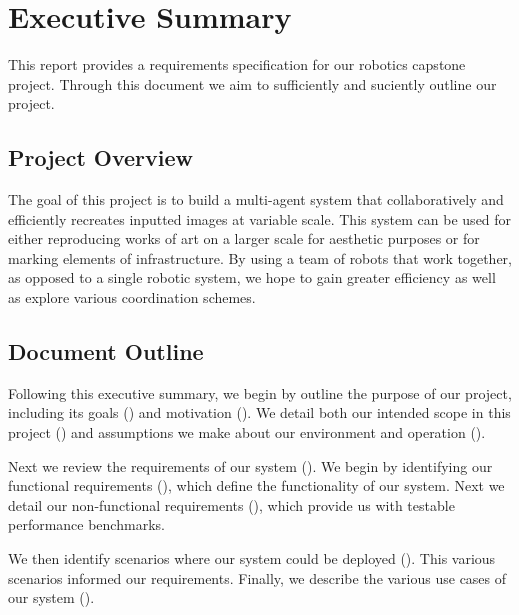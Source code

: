 
\section {Executive Summary}
\label{sec:executive_summary}
This report provides a requirements specification for our robotics capstone project. Through this document we aim to sufficiently and suciently outline our project. 

\subsection{Project Overview}
The goal of this project is to build a multi-agent system that collaboratively and efficiently recreates inputted images at variable scale. 
This system can be used for either reproducing works of art on a larger scale for aesthetic purposes or for marking elements of infrastructure. 
By using a team of robots that work together, as opposed to a single robotic system, we hope to gain greater efficiency as well as explore various coordination schemes. 


\subsection{Document Outline}
Following this executive summary, we begin by outline the purpose of our project, including its goals () and motivation (). 
We detail both our intended scope in this project () and assumptions we make about our environment and operation (). 

Next we review the requirements of our system (). 
We begin by identifying our functional requirements (), which define the functionality of our system. 
Next we detail our non-functional requirements (), which provide us with testable performance benchmarks.

We then identify scenarios where our system could be deployed (). This various scenarios informed our requirements.  Finally, we describe the various use cases of our system (). 
